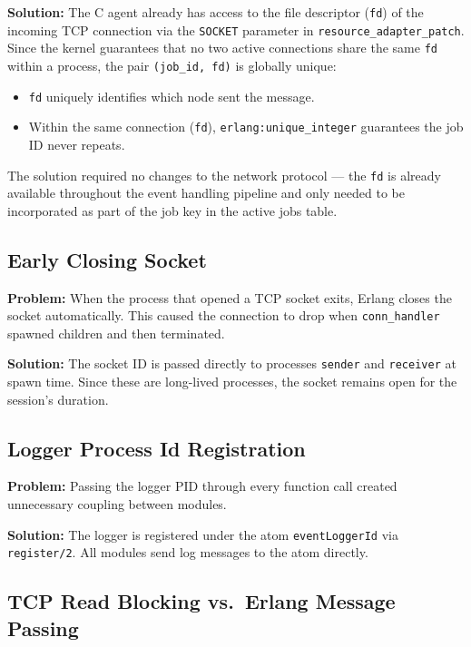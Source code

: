 \documentclass[12pt,a4paper]{article}
\begin{document}
\textbf{Solution:} The C agent already has access to the file descriptor (\texttt{fd}) of the incoming TCP connection via the \texttt{SOCKET} parameter in \texttt{resource\_adapter\_patch}. Since the kernel guarantees that no two active connections share the same \texttt{fd} within a process, the pair \texttt{(job\_id, fd)} is globally unique:

\begin{itemize}
    \item \texttt{fd} uniquely identifies which node sent the message.
    \item Within the same connection (\texttt{fd}), \texttt{erlang:unique\_integer} guarantees the job ID never repeats.
\end{itemize}

The solution required no changes to the network protocol — the \texttt{fd} is already available throughout the event handling pipeline and only needed to be incorporated as part of the job key in the active jobs table.

\subsection{Early Closing Socket}

\textbf{Problem:} When the process that opened a TCP socket exits, Erlang closes
the socket automatically. This caused the connection to drop when \texttt{conn\_handler}
spawned children and then terminated.

\textbf{Solution:} The socket ID is passed directly to processes \texttt{sender} and \texttt{receiver} at spawn time. Since these are long-lived processes, the socket remains open for the session's duration.

\subsection{Logger Process Id Registration}

\textbf{Problem:} Passing the logger PID through every function call created
unnecessary coupling between modules.

\textbf{Solution:} The logger is registered under the atom \texttt{eventLoggerId}
via \texttt{register/2}. All modules send log messages to the atom directly.

\subsection{TCP Read Blocking vs.\ Erlang Message Passing}
\end{document}
